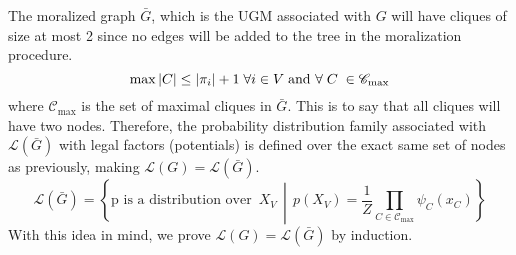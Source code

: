 \documentclass{article}
\numberwithin{equation}{section}
\newcommand{\s}{\hspace{0.1cm}}
\theoremstyle{named}
\begin{document}
The moralized graph $\bar{G}$, which is the UGM associated with $G$ will have cliques 
of size at most 2 since no edges will be added to the tree in the moralization 
procedure. 
\[
        \max |C| \leq |\pi_i| + 1 \s \forall i \in V\s \text{and } 
        \forall \s C \s \in \mathscr{C}_{\max}
\]
where $\mathscr{C}_{\max}$ is the set of maximal cliques in $\bar{G}$.
This is to say that all cliques will have two nodes.
Therefore, the probability distribution family associated with $\mathcal{L}(\bar{G})$ 
with legal factors (potentials) is defined over the exact same set of nodes 
as previously, making $\mathcal{L}(G) = \mathcal{L}(\bar{G})$. 
\[
        \mathcal{L}(\bar{G}) = \left\{   \text{p is a distribution over }\, X_V
        \,\middle\vert\, 
        p(X_V) = \frac{1}{Z} \prod_{C \in \mathscr{C}_{\max}} \psi_C(x_C) 
 \right\}
\]
With this idea in mind, we prove $\mathcal{L}(G) = \mathcal{L}(\bar{G})$ by 
induction.
\end{document}
